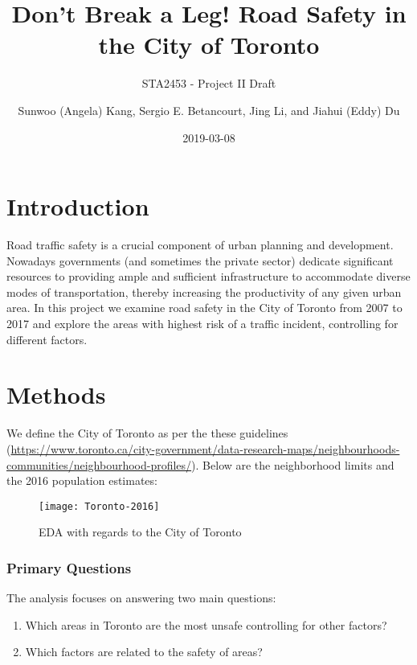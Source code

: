 \documentclass[]{article}
\title{Don't Break a Leg! Road Safety in the City of Toronto}
\subtitle{STA2453 - Project II Draft}
\author{Sunwoo (Angela) Kang, Sergio E. Betancourt, Jing Li, and Jiahui (Eddy)
Du}
\date{2019-03-08}
\begin{document}
\maketitle

\section{Introduction}\label{introduction}

Road traffic safety is a crucial component of urban planning and
development. Nowadays governments (and sometimes the private sector)
dedicate significant resources to providing ample and sufficient
infrastructure to accommodate diverse modes of transportation, thereby
increasing the productivity of any given urban area. In this project we
examine road safety in the City of Toronto from 2007 to 2017 and explore
the areas with highest risk of a traffic incident, controlling for
different factors.

\section{Methods}\label{methods}

We define the City of Toronto as per the these guidelines
(\url{https://www.toronto.ca/city-government/data-research-maps/neighbourhoods-communities/neighbourhood-profiles/}).
Below are the neighborhood limits and the 2016 population estimates:

\begin{figure}[H]

{\centering \texttt{[image: Toronto-2016]} 

}

\caption{\label{fig:figs}EDA with regards to the City of Toronto}\label{fig:unnamed-chunk-2}
\end{figure}

\subsubsection{Primary Questions}\label{primary-questions}

The analysis focuses on answering two main questions:

\begin{enumerate}
  \item Which areas in Toronto are the most unsafe controlling for other factors?
  \item Which factors are related to the safety of areas?
\end{enumerate}
\end{document}
